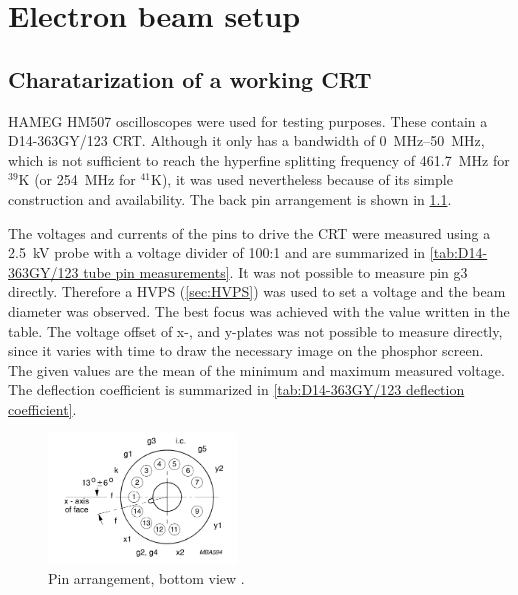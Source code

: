 \chapter{Electron beam setup}
\label{ch:Electron beam setup}

\section{Charatarization of a working CRT}
\label{sec:Charatarization of a working CRT}

HAMEG HM507 oscilloscopes \autocite{HM507-manual} were used for testing purposes. These contain a D14-363GY/123 \autocite{D14363GY123-manual} CRT. Although it only has a bandwidth of \SIrange{0}{50}{\mega\hertz}, which is not sufficient to reach the hyperfine splitting frequency of \SI{461.7}{\mega\hertz} for $^{39}\mathrm{K}$ \cite{tiecke:potassium-properties} (or \SI{254}{\mega\hertz} for $^{41}\mathrm{K}$), it was used nevertheless because of its simple construction and availability. The back pin arrangement is shown in \cref{fig:pin arrangement}.

The voltages and currents of the pins to drive the CRT were measured using a \SI{2.5}{\kilo\volt} probe with a voltage divider of 100:1 and are summarized in \cref{tab:D14-363GY/123 tube pin measurements}. It was not possible to measure pin g3 directly. Therefore a HVPS (\cref{sec:HVPS}) was used to set a voltage and the beam diameter was observed. The best focus was achieved with the value written in the table. The voltage offset of x-, and y-plates was not possible to measure directly, since it varies with time to draw the necessary image on the phosphor screen. The given values are the mean of the minimum and maximum measured voltage. The deflection coefficient is summarized in \cref{tab:D14-363GY/123 deflection coefficient}.

\begin{figure}[ht]
	\centering
	\includegraphics[width=5cm]{./Chapters/e-beam-setup/pin arrangement}
	\caption{Pin arrangement, bottom view \autocite{D14363GY123-manual}.}
	\label{fig:pin arrangement}
\end{figure}


